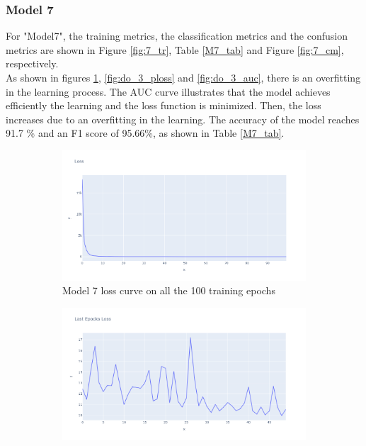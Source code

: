 \subsubsection{Model 7}
For "Model7", the training metrics, the classification metrics and the confusion metrics are shown in Figure \ref{fig:7_tr}, Table \ref{M7_tab} and Figure \ref{fig:7_cm}, respectively.\\
  As shown in figures \ref{fig:do_3_tloss}, \ref{fig:do_3_ploss} and \ref{fig:do_3_auc}, there is an overfitting in the learning process. The AUC curve illustrates that the model achieves efficiently the learning and the loss function is minimized. Then, the loss increases due to an overfitting in the learning. The accuracy of the model reaches 91.7 \% and an F1 score of 95.66\%, as shown in Table \ref{M7_tab}.
\begin{figure}[H]%
    \centering
    \begin{subfigure}{0.49\textwidth}
        \centering
        \includegraphics[width=\linewidth]{figures/ev/do_3_tloss.png}
        \caption{Model 7 loss curve on all the 100 training epochs}
    \label{fig:do_3_tloss}
    \end{subfigure}
    \begin{subfigure}{0.49\textwidth}
        \centering
         \includegraphics[width=\linewidth]{figures/ev/do_3_ploss.png}

\end{subfigure}
\end{figure}
